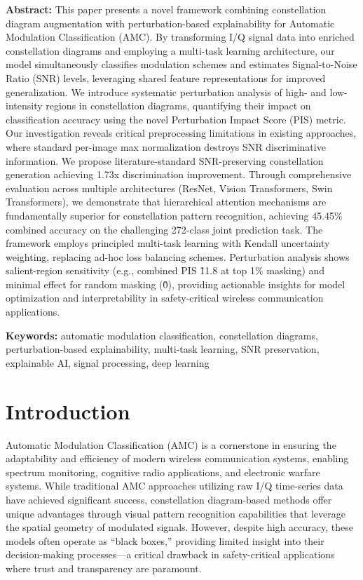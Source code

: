 \documentclass{ELSP}
\begin{document}
\noindent\textbf{\textcolor[RGB]{0,131,255}{Abstract:}} This paper presents a novel framework combining constellation diagram augmentation with perturbation-based explainability for Automatic Modulation Classification (AMC). By transforming I/Q signal data into enriched constellation diagrams and employing a multi-task learning architecture, our model simultaneously classifies modulation schemes and estimates Signal-to-Noise Ratio (SNR) levels, leveraging shared feature representations for improved generalization. We introduce systematic perturbation analysis of high- and low-intensity regions in constellation diagrams, quantifying their impact on classification accuracy using the novel Perturbation Impact Score (PIS) metric. Our investigation reveals critical preprocessing limitations in existing approaches, where standard per-image max normalization destroys SNR discriminative information. We propose literature-standard SNR-preserving constellation generation achieving 1.73x discrimination improvement. Through comprehensive evaluation across multiple architectures (ResNet, Vision Transformers, Swin Transformers), we demonstrate that hierarchical attention mechanisms are fundamentally superior for constellation pattern recognition, achieving 45.45\% combined accuracy on the challenging 272-class joint prediction task. The framework employs principled multi-task learning with Kendall uncertainty weighting, replacing ad-hoc loss balancing schemes. Perturbation analysis shows salient-region sensitivity (e.g., combined PIS \~11.8 at top 1\% masking) and minimal effect for random masking (\~0), providing actionable insights for model optimization and interpretability in safety-critical wireless communication applications.

\noindent\textbf{\textcolor[RGB]{0,131,255}{Keywords:}} automatic modulation classification, constellation diagrams, perturbation-based explainability, multi-task learning, SNR preservation, explainable AI, signal processing, deep learning

\section{Introduction}

Automatic Modulation Classification (AMC) is a cornerstone in ensuring the adaptability and efficiency of modern wireless communication systems, enabling spectrum monitoring, cognitive radio applications, and electronic warfare systems. While traditional AMC approaches utilizing raw I/Q time-series data have achieved significant success, constellation diagram-based methods offer unique advantages through visual pattern recognition capabilities that leverage the spatial geometry of modulated signals. However, despite high accuracy, these models often operate as ``black boxes,'' providing limited insight into their decision-making processes—a critical drawback in safety-critical applications where trust and transparency are paramount.
\end{document}

